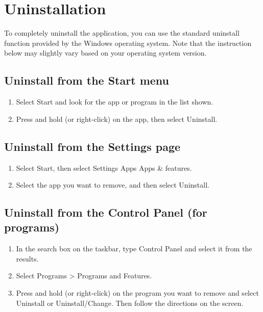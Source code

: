 \section{Uninstallation}

To completely uninstall the application, you can use the standard uninstall function provided by the Windows operating system. Note that the instruction below may slightly vary based on your operating system version.

\subsection*{Uninstall from the Start menu}
\begin{enumerate}
	\item Select Start and look for the app or program in the list shown.
	\item Press and hold (or right-click) on the app, then select Uninstall.
\end{enumerate}

\subsection*{Uninstall from the Settings page}
\begin{enumerate}
	\item Select Start, then select Settings \> Apps \> Apps \& features.
	\item Select the app you want to remove, and then select Uninstall.
\end{enumerate}

\subsection*{Uninstall from the Control Panel (for programs)}
\begin{enumerate}
	\item In the search box on the taskbar, type Control Panel and select it from the results.
	\item Select Programs > Programs and Features.
	\item Press and hold (or right-click) on the program you want to remove and select Uninstall or Uninstall/Change. Then follow the directions on the screen.
\end{enumerate}